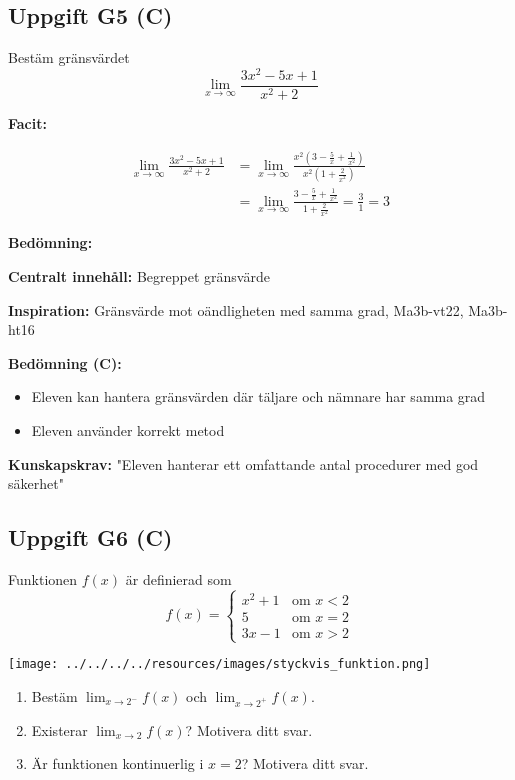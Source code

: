 \documentclass[12pt]{article}
\begin{document}
\subsection*{Uppgift G5 (C)}
Bestäm gränsvärdet
\[
\lim_{x \to \infty} \frac{3x^2 - 5x + 1}{x^2 + 2}
\]

\begin{facitbox}
\textbf{Facit:}

\begin{align*}
\lim_{x \to \infty} \frac{3x^2 - 5x + 1}{x^2 + 2} &= \lim_{x \to \infty} \frac{x^2(3 - \frac{5}{x} + \frac{1}{x^2})}{x^2(1 + \frac{2}{x^2})} \\
&= \lim_{x \to \infty} \frac{3 - \frac{5}{x} + \frac{1}{x^2}}{1 + \frac{2}{x^2}} = \frac{3}{1} = 3
\end{align*}
\end{facitbox}

\begin{refbox}
\textbf{Bedömning:}

\textbf{Centralt innehåll:} Begreppet gränsvärde

\textbf{Inspiration:} Gränsvärde mot oändligheten med samma grad, Ma3b-vt22, Ma3b-ht16

\textbf{Bedömning (C):}
\begin{itemize}
    \item Eleven kan hantera gränsvärden där täljare och nämnare har samma grad
    \item Eleven använder korrekt metod
\end{itemize}

\textbf{Kunskapskrav:} "Eleven hanterar ett omfattande antal procedurer med god säkerhet"
\end{refbox}

\subsection*{Uppgift G6 (C)}
Funktionen $f(x)$ är definierad som
\[
f(x) = \begin{cases}
x^2 + 1 & \text{om } x < 2 \\
5 & \text{om } x = 2 \\
3x - 1 & \text{om } x > 2
\end{cases}
\]

\begin{center}
\texttt{[image: ../../../../resources/images/styckvis\_funktion.png]}
\end{center}

\begin{enumerate}[label=\alph*)]
    \item Bestäm $\lim_{x \to 2^-} f(x)$ och $\lim_{x \to 2^+} f(x)$.
    \item Existerar $\lim_{x \to 2} f(x)$? Motivera ditt svar.
    \item Är funktionen kontinuerlig i $x = 2$? Motivera ditt svar.
\end{enumerate}
\end{document}
